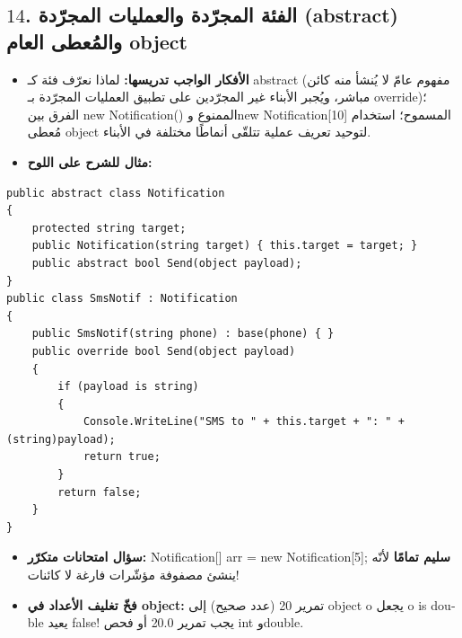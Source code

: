 \documentclass[14pt]{extarticle}
\begin{document}
\subsection*{$14$. الفئة المجرّدة والعمليات المجرّدة (\textenglish{abstract}) والمُعطى العام \textenglish{object}}
\begin{itemize}[itemsep=0.25em]
    \item \textbf{الأفكار الواجب تدريسها:} لماذا نعرّف فئة كـ \textenglish{abstract} (مفهوم عامّ لا يُنشأ منه كائن مباشر، ويُجبر الأبناء غير المجرّدين على تطبيق العمليات المجرّدة بـ \textenglish{override})؛ الفرق بين \textenglish{new Notification()} الممنوع و\textenglish{new Notification[10]} المسموح؛ استخدام مُعطى \textenglish{object} لتوحيد تعريف عملية تتلقّى أنماطًا مختلفة في الأبناء.
    \item \textbf{مثال للشرح على اللوح:}
\end{itemize}
\begin{boxCode}
\begin{english}
\begin{verbatim}
public abstract class Notification
{
    protected string target;
    public Notification(string target) { this.target = target; }
    public abstract bool Send(object payload);
}
public class SmsNotif : Notification
{
    public SmsNotif(string phone) : base(phone) { }
    public override bool Send(object payload)
    {
        if (payload is string)
        {
            Console.WriteLine("SMS to " + this.target + ": " + (string)payload);
            return true;
        }
        return false;
    }
}
\end{verbatim}
\end{english}
\end{boxCode}
\begin{boxWarning}
\begin{itemize}
    \item \textbf{سؤال امتحانات متكرّر:} \textenglish{Notification[] arr = new Notification[5];} \textbf{سليم تمامًا} لأنّه ينشئ مصفوفة مؤشّرات فارغة لا كائنات!
    \item \textbf{فخّ تغليف الأعداد في \textenglish{object}:} تمرير \textenglish{20} (عدد صحيح) إلى \textenglish{object o} يجعل \textenglish{o is double} يعيد \textenglish{false}! يجب تمرير \textenglish{20.0} أو فحص \textenglish{int} و\textenglish{double}.
\end{itemize}
\end{boxWarning}

\filbreak
\end{document}
